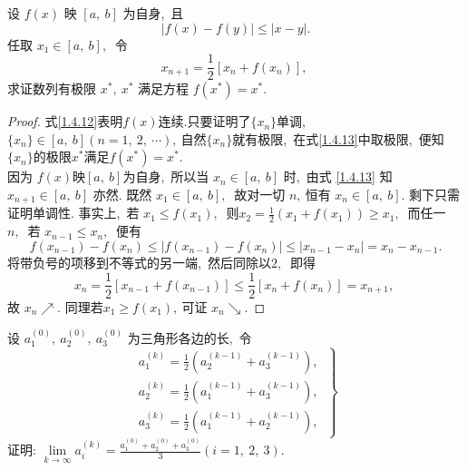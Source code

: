 \newpage
\begin{problem}
	设  $f(x) $ 映  $[a,\  b] $ 为自身,\  且
	\begin{equation}
		|f(x)-f(y)| \leqslant|x-y|.\label{1.4.12}
	\end{equation}
	任取 $ x_{1} \in[a,\  b] ,\ $ 令
	\begin{equation}
		x_{n+1}=\frac{1}{2}\left[x_{n}+f\left(x_{n}\right)\right],\ \label{1.4.13}
	\end{equation}
	求证数列有极限 $ x^{*},\  x^{*} $ 满足方程 $ f\left(x^{*}\right)=x^{*} .$
\end{problem}
\begin{proof}
	式\eqref{1.4.12}表明$f(x)$连续.只要证明了$\{x_n\}$单调,\ $\{x_n\}\in [a,\ b](n=1,\ 2,\ \cdots),\ $自然$\{x_n\}$就有极限,\ 在式\eqref{1.4.13}中取极限,\ 便知$\{x_n\}$的极限$x^*$满足$f(x^*)=x^*.$\\
	因为 $ f(x)  $映$  [a,\  b]  $为自身,\  所以当 $ x_{n} \in[a,\  b] $ 时,\  由式 \eqref{1.4.13} 知 $ x_{n+1} \in[a,\  b]$  亦然. 既然 $ x_{1} \in[a,\  b] ,\ $ 故对一切 $ n ,\  $恒有 $ x_{n} \in[a,\  b] .$ 剩下只需证明单调性. 事实上,\  若 $ x_{1} \leqslant f\left(x_{1}\right) ,\ $ 则$  x_{2}=\frac{1}{2}\left(x_{1}+f\left(x_{1}\right)\right) \geqslant x_{1} ,\ $ 而任一 $ n ,\ $ 若 $ x_{n-1} \leqslant x_{n} ,\ $ 便有
	$$f\left(x_{n-1}\right)-f\left(x_{n}\right) \leqslant\left|f\left(x_{n-1}\right)-f\left(x_{n}\right)\right| \leqslant\left|x_{n-1}-x_{n}\right|=x_{n}-x_{n-1} .$$
	将带负号的项移到不等式的另一端,\  然后同除以$ 2 ,\ $ 即得
	$$x_{n}=\frac{1}{2}\left[x_{n-1}+f\left(x_{n-1}\right)\right] \leqslant \frac{1}{2}\left[x_{n}+f\left(x_{n}\right)\right]=x_{n+1},\ $$
	故  $x_{n} \nearrow .$ 同理若$  x_{1} \geqslant f\left(x_{1}\right) ,\  $可证 $ x_{n} \searrow .$
\end{proof}
\newpage
\begin{problem}
	设 $ a_{1}^{(0)},\  a_{2}^{(0)},\  a_{3}^{(0)} $ 为三角形各边的长,\  令
	\begin{equation}
		\left.\begin{array}{l}
			a_{1}^{(k)}=\frac{1}{2}\left(a_{2}^{(k-1)}+a_{3}^{(k-1)}\right),\  \\
			a_{2}^{(k)}=\frac{1}{2}\left(a_{1}^{(k-1)}+a_{3}^{(k-1)}\right),\  \\
			a_{3}^{(k)}=\frac{1}{2}\left(a_{1}^{(k-1)}+a_{2}^{(k-1)}\right),\ 
		\end{array}\right\}\label{1.4.14}
	\end{equation}
	证明:  $\lim\limits_{k \rightarrow \infty} a_{i}^{(k)}=\frac{a_{1}^{(0)}+a_{2}^{(0)}+a_{3}^{(0)}}{3}(i=1,\ 2,\ 3) .$
\end{problem}
